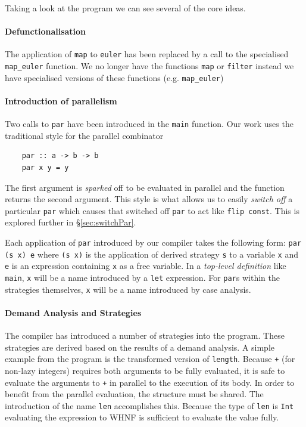 Taking a look at the program we can see several of the core ideas.

\paragraph{Defunctionalisation}
The application of \verb-map- to \verb-euler- has been replaced by a call to
the specialised \verb-map_euler- function.  We no longer have the functions
\verb-map- or \verb-filter- instead we have specialised versions of these
functions (e.g. \verb-map_euler-)

\paragraph{Introduction of parallelism}
Two calls to \verb-par- have been introduced in the \texttt{main} function. Our
work uses the traditional style for the parallel combinator \citep{strategies}

\begin{verbatim}
    par :: a -> b -> b
    par x y = y
\end{verbatim}

The first argument is \emph{sparked} off to be evaluated in parallel and the
function returns the second argument. This style is what allows us to easily
\emph{switch off} a particular \verb-par- which causes that switched off
\verb-par- to act like \verb-flip const-. This is explored further in
\S\ref{sec:switchPar}.

Each application of \verb-par- introduced by our compiler takes the following
form: \verb-par (s x) e- where \verb-(s x)- is the application of derived
strategy \verb-s- to a variable \verb$x$ and \verb$e$ is an expression containing \verb$x$ as a
free variable.  In a \emph{top-level definition} like \verb-main-, \verb$x$ will be a
name introduced by a \verb-let- expression. For \verb-par-s within the
strategies themselves, \verb$x$ will be a name introduced by case analysis.

\paragraph{Demand Analysis and Strategies}

The compiler has introduced a number of strategies into the program. These
strategies are derived based on the results of a demand analysis. A simple
example from the program is the transformed version of \verb-length-. Because
\verb-+- (for non-lazy integers) requires both arguments to be fully evaluated, it is safe to 
evaluate the arguments to \verb-+- in parallel to the execution of its body.
In order to benefit from the parallel evaluation, the structure must be shared.
The introduction of the name \verb-len- accomplishes this. Because the type
of \verb-len- is \verb-Int- evaluating the expression to WHNF is sufficient to
evaluate the value fully. 

